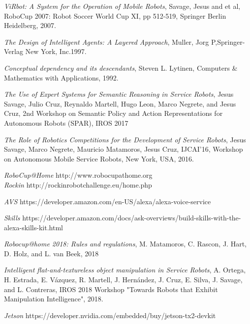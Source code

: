 \documentclass{llncs}
\begin{document}
\begin{thebibliography}{1}

{\em ViRbot: A System for the Operation of Mobile Robots}, Savage, Jesus and et al, RoboCup 2007: Robot Soccer World Cup XI,
pp 512-519, Springer Berlin Heidelberg, 2007.

{\em The Design of Intelligent Agents: A Layered Approach}, Muller, Jorg P,Springer-Verlag New York, Inc.1997.

{\em Conceptual dependency and its descendants}, Steven L. Lytinen, Computers \& Mathematics with Applications, 1992.

\textit{The Use of Expert Systems for Semantic Reasoning in Service Robots}, Jesus Savage, Julio Cruz, Reynaldo Martell, Hugo Leon, Marco Negrete, and Jesus Cruz, 2nd Workshop on Semantic Policy and Action Representations for Autonomous Robots (SPAR), IROS 2017

{\em The Role of Robotics Competitions for the Development of Service Robots}, 
 Jesus Savage, Marco Negrete, Mauricio Matamoros, Jesus Cruz,
IJCAI'16, Workshop on Autonomous Mobile Service Robots, New York, USA, 2016.

{\em RoboCup@Home} http://www.robocupathome.org
\\
{\em Rockin} http://rockinrobotchallenge.eu/home.php

 {\em AVS} https://developer.amazon.com/en-US/alexa/alexa-voice-service

 {\em Skills} https://developer.amazon.com/docs/ask-overviews/build-skills-with-the-alexa-skills-kit.html



\textit{Robocup@home 2018: Rules and regulations}, M. Matamoros, C. Rascon, J. Hart, D. Holz, and L. van Beek, 2018

\textit{Intelligent flat-and-textureless object manipulation in Service Robots}, A. Ortega, H. Estrada, E. Vázquez, R. Martell, J. Hernández, J. Cruz, E. Silva, J. Savage, and L. Contreras, IROS 2018 Workshop "Towards Robots that Exhibit Manipulation Intelligence", 2018.

{\em Jetson} https://developer.nvidia.com/embedded/buy/jetson-tx2-devkit

\end{thebibliography}
\end{document}
